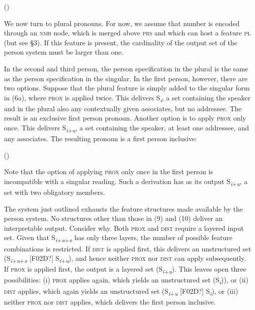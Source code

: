 \documentclass[output=paper]{langsci/langscibook}
\begin{document}
 

(\label{bkm:Ref254355362})

We now turn to plural pronouns. For now, we assume that number is encoded through an \textsc{nmb} node, which is merged above \textsc{prs} and which can host a feature \textsc{pl} (but see §3). If this feature is present, the cardinality of the output set of the person system must be larger than one.

In the second and third person, the person specification in the plural is the same as the person specification in the singular. In the first person, however, there are two options. Suppose that the plural feature is simply added to the singular form in (6a), where \textsc{prox} is applied twice. This delivers S\textit{\textsubscript{i}}, a set containing the speaker and in the plural also any contextually given associates, but no addressee. The result is an exclusive first person pronoun. Another option is to apply \textsc{prox} only once. This delivers S\textit{\textsubscript{i}}\textsubscript{+}\textit{\textsubscript{u}}, a set containing the speaker, at least one addressee, and any associates. The resulting pronoun is a first person inclusive:

(\label{bkm:Ref328732770}\label{bkm:Ref254355366})

 

Note that the option of applying \textsc{prox} only once in the first person is incompatible with a singular reading. Such a derivation has as its output S\textit{\textsubscript{i}}\textsubscript{+}\textit{\textsubscript{u}}, a set with two obligatory members.

The system just outlined exhausts the feature structures made available by the person system. No structures other than those in (9) and (10) deliver an interpretable output. Consider why. Both \textsc{prox} and \textsc{dist} require a layered input set. Given that S\textit{\textsubscript{i}}\textsubscript{+}\textit{\textsubscript{u}}\textsubscript{+}\textit{\textsubscript{o}} has only three layers, the number of possible feature combinations is restricted. If \textsc{dist} is applied first, this delivers an unstructured set (S\textit{\textsubscript{i}}\textsubscript{+}\textit{\textsubscript{u}}\textsubscript{+}\textit{\textsubscript{o}} [F02D?] S\textit{\textsubscript{i}}\textsubscript{+}\textit{\textsubscript{u}}), and hence neither \textsc{prox} nor \textsc{dist} can apply subsequently. If \textsc{prox} is applied first, the output is a layered set (S\textit{\textsubscript{i}}\textsubscript{+}\textit{\textsubscript{u}}). This leaves open three possibilities: (i) \textsc{prox} applies again, which yields an unstructured set (S\textit{\textsubscript{i}})), or (ii) \textsc{dist} applies, which again yields an unstructured set (S\textit{\textsubscript{i}}\textsubscript{+}\textit{\textsubscript{u}} [F02D?] S\textit{\textsubscript{i}}), or (iii) neither \textsc{prox} nor \textsc{dist} applies, which delivers the first person inclusive.
\end{document}
